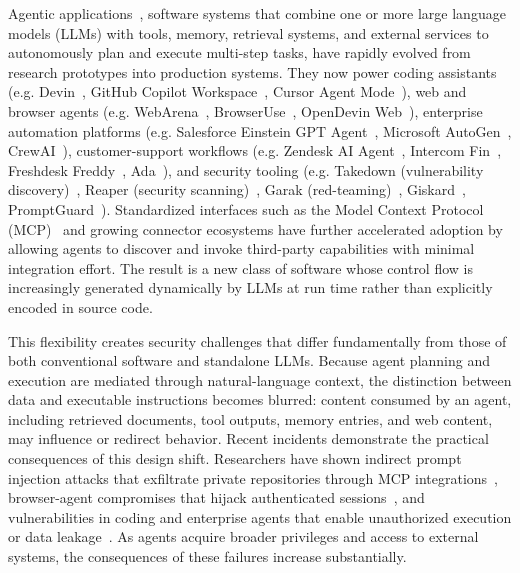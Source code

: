 \label{chap:intro}
Agentic applications~\cite{agentic-survey}, software systems that combine one or more large language models (LLMs) with tools, memory, retrieval systems, and external services to autonomously plan and execute multi-step tasks, have rapidly evolved from research prototypes into production systems. They now power coding assistants (e.g. Devin~\cite{devin}, GitHub Copilot Workspace~\cite{copilot-workspace}, Cursor Agent Mode~\cite{cursor}), web and browser agents (e.g. WebArena~\cite{webarena}, BrowserUse~\cite{browser-use}, OpenDevin Web~\cite{opendevin}), enterprise automation platforms (e.g. Salesforce Einstein GPT Agent~\cite{salesforce-agentforce}, Microsoft AutoGen~\cite{autogen}, CrewAI~\cite{crewai}), customer-support workflows (e.g. Zendesk AI Agent~\cite{zendesk-ai-agent}, Intercom Fin~\cite{intercom-fin}, Freshdesk Freddy~\cite{freshdesk-freddy}, Ada~\cite{ada-support}), and security tooling (e.g. Takedown (vulnerability discovery)~\cite{takedown}, Reaper (security scanning)~\cite{reaper-scanner}, Garak (red-teaming)~\cite{garak2024}, Giskard~\cite{giskard}, PromptGuard~\cite{promptguard2025}). Standardized interfaces such as the Model Context Protocol (MCP)~\cite{mcp-blog} and growing connector ecosystems have further accelerated adoption by allowing agents to discover and invoke third-party capabilities with minimal integration effort. The result is a new class of software whose control flow is increasingly generated dynamically by LLMs at run time rather than explicitly encoded in source code.

This flexibility creates security challenges that differ fundamentally from those of both conventional software and standalone LLMs. Because agent planning and execution are mediated through natural-language context, the distinction between data and executable instructions becomes blurred: content consumed by an agent, including retrieved documents, tool outputs, memory entries, and web content, may influence or redirect behavior. Recent incidents demonstrate the practical consequences of this design shift. Researchers have shown indirect prompt injection attacks that exfiltrate private repositories through MCP integrations~\cite{mcp-blog}, browser-agent compromises that hijack authenticated sessions~\cite{pleasefix}, and vulnerabilities in coding and enterprise agents that enable unauthorized execution or data leakage~\cite{takedown}. As agents acquire broader privileges and access to external systems, the consequences of these failures increase substantially.

